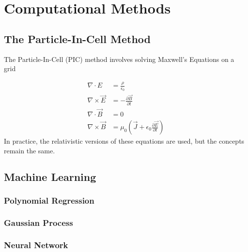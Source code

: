 \chapter{Computational Methods} \label{ch:3}

\section{The Particle-In-Cell Method}

The Particle-In-Cell (PIC) method involves solving Maxwell's Equations on a grid 

\begin{align}
	\nabla \cdot E &= \frac{\rho}{\epsilon_0}  \label{eq:gauss} \\
	\nabla \times \vec{E} &= - \frac{\partial \vec{B}}{\partial t} \label{eq:faraday} \\
	\nabla \cdot \vec{B} &= 0 \\
	\nabla \times \vec{B} &= \mu_0 (\vec{J} + \epsilon_0 \frac{\partial \vec{E}}{\partial t}) \label{eq:ampere}
\end{align}
In practice, the relativistic versions of these equations are used, but the concepts remain the same. 

\section{Machine Learning}

\subsection{Polynomial Regression}

\subsection{Gaussian Process}

\subsection{Neural Network}